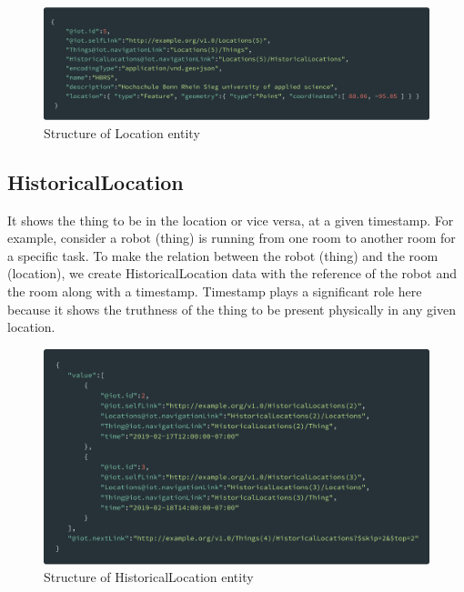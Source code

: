 	\begin{figure}[!htbp] 
		\begin{center}
			\includegraphics[scale=0.1]{./images/png/ogc/location}	
			\caption{Structure of Location entity}	
			\label{fig:location}	
		\end{center}
	\end{figure}

	\subsection{HistoricalLocation}
	It shows the thing to be in the location or vice versa, at a given timestamp. For example, consider a robot (thing) is running from one room to another room for a specific task. To make the relation between the robot (thing) and the room (location), we create HistoricalLocation data with the reference of the robot and the room along with a timestamp. Timestamp plays a significant role here because it shows the truthness of the thing to be present physically in any given location.
	
	\begin{figure}[!htbp] 
		\begin{center}
			\includegraphics[scale=0.1]{./images/png/ogc/historical_location}	
			\caption{Structure of HistoricalLocation entity}	
			\label{fig:historical_location}	
		\end{center}
	\end{figure}

